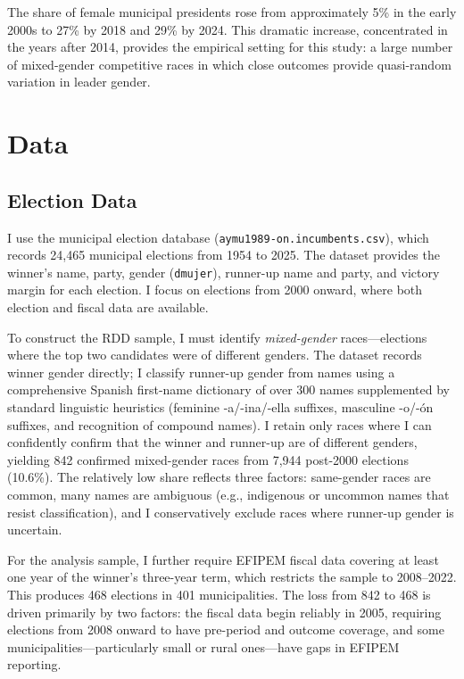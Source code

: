 \documentclass[12pt]{article}
\begin{document}
The share of female municipal presidents rose from approximately 5\% in the early 2000s to 27\% by 2018 and 29\% by 2024. This dramatic increase, concentrated in the years after 2014, provides the empirical setting for this study: a large number of mixed-gender competitive races in which close outcomes provide quasi-random variation in leader gender.


\section{Data}

\subsection{Election Data}

I use the \citet{emagar2025} municipal election database (\texttt{aymu1989-on.incumbents.csv}), which records 24,465 municipal elections from 1954 to 2025. The dataset provides the winner's name, party, gender (\texttt{dmujer}), runner-up name and party, and victory margin for each election. I focus on elections from 2000 onward, where both election and fiscal data are available.

To construct the RDD sample, I must identify \textit{mixed-gender} races---elections where the top two candidates were of different genders. The dataset records winner gender directly; I classify runner-up gender from names using a comprehensive Spanish first-name dictionary of over 300 names supplemented by standard linguistic heuristics (feminine -a/-ina/-ella suffixes, masculine -o/-ón suffixes, and recognition of compound names). I retain only races where I can confidently confirm that the winner and runner-up are of different genders, yielding 842 confirmed mixed-gender races from 7,944 post-2000 elections (10.6\%). The relatively low share reflects three factors: same-gender races are common, many names are ambiguous (e.g., indigenous or uncommon names that resist classification), and I conservatively exclude races where runner-up gender is uncertain.

For the analysis sample, I further require EFIPEM fiscal data covering at least one year of the winner's three-year term, which restricts the sample to 2008--2022. This produces 468 elections in 401 municipalities. The loss from 842 to 468 is driven primarily by two factors: the fiscal data begin reliably in 2005, requiring elections from 2008 onward to have pre-period and outcome coverage, and some municipalities---particularly small or rural ones---have gaps in EFIPEM reporting.
\end{document}
